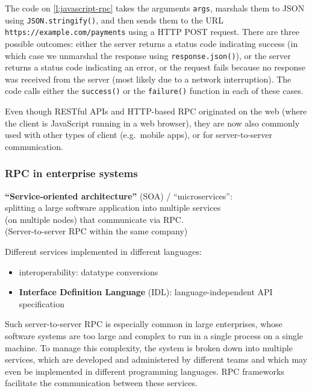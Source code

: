 The code on \autoref{l:javascript-rpc} takes the arguments \verb|args|, marshals them to JSON using \verb|JSON.stringify()|, and then sends them to the URL \verb|https://example.com/payments| using a HTTP POST request.
There are three possible outcomes: either the server returns a status code indicating success (in which case we unmarshal the response using \verb|response.json()|), or the server returns a status code indicating an error, or the request fails because no response was received from the server (most likely due to a network interruption).
The code calls either the \verb|success()| or the \verb|failure()| function in each of these cases.

Even though RESTful APIs and HTTP-based RPC originated on the web (where the client is JavaScript running in a web browser), they are now also commonly used with other types of client (e.g.\ mobile apps), or for server-to-server communication.

\begin{frame}
    \label{s:rpc-discussion}
    \frametitle{RPC in enterprise systems}
    \textbf{``Service-oriented architecture''} (SOA) / ``microservices'':\\[1em]
    splitting a large software application into multiple services\\ (on multiple nodes) that communicate via RPC.\\[1em]
    (Server-to-server RPC within the same company)\\[1.5em]\pause

    Different services implemented in different languages:
    \begin{itemize}
        \item interoperability: datatype conversions
        \item \textbf{Interface Definition Language} (IDL): language-independent API specification
    \end{itemize}
\end{frame}

Such server-to-server RPC is especially common in large enterprises, whose software systems are too large and complex to run in a single process on a single machine.
To manage this complexity, the system is broken down into multiple services, which are developed and administered by different teams and which may even be implemented in different programming languages.
RPC frameworks facilitate the communication between these services.


